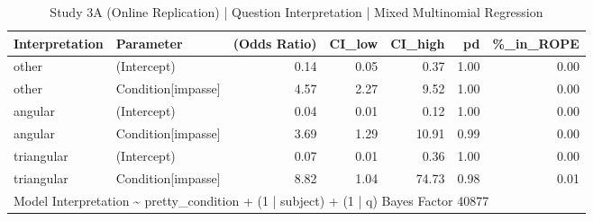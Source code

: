 \begin{table}

\caption{Study 3A (Online Replication) | Question Interpretation | Mixed Multinomial Regression}
\centering
\begin{tabular}[t]{l|l|r|r|r|r|r}
\hline
Interpretation & Parameter & (Odds Ratio) & CI\_low & CI\_high & pd & \%\_in\_ROPE\\
\hline
other & (Intercept) & 0.14 & 0.05 & 0.37 & 1.00 & 0.00\\
\hline
other & Condition[impasse] & 4.57 & 2.27 & 9.52 & 1.00 & 0.00\\
\hline
angular & (Intercept) & 0.04 & 0.01 & 0.12 & 1.00 & 0.00\\
\hline
angular & Condition[impasse] & 3.69 & 1.29 & 10.91 & 0.99 & 0.00\\
\hline
triangular & (Intercept) & 0.07 & 0.01 & 0.36 & 1.00 & 0.00\\
\hline
triangular & Condition[impasse] & 8.82 & 1.04 & 74.73 & 0.98 & 0.01\\
\hline
\multicolumn{7}{l}{\rule{0pt}{1em}Model Interpretation \textasciitilde{}  pretty\_condition + (1 | subject) + (1 | q) Bayes Factor  40877}\\
\end{tabular}
\end{table}

